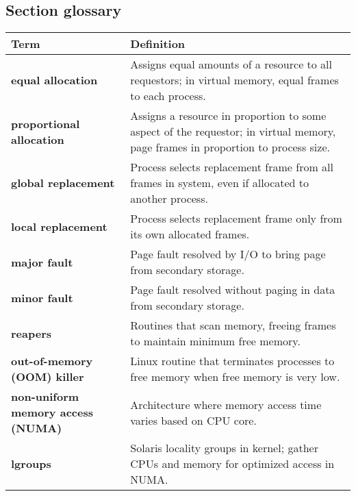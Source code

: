 \vspace{1em}
\subsection*{Section glossary}
\begin{tabular}{p{}p{}}
    \toprule
    \rowcolor{gray!20} \textbf{Term} & \textbf{Definition} \\
    \midrule
    \textbf{equal allocation} & Assigns equal amounts of a resource to all requestors; in virtual memory, equal frames to each process. \\
    \textbf{proportional allocation} & Assigns a resource in proportion to some aspect of the requestor; in virtual memory, page frames in proportion to process size. \\
    \textbf{global replacement} & Process selects replacement frame from all frames in system, even if allocated to another process. \\
    \textbf{local replacement} & Process selects replacement frame only from its own allocated frames. \\
    \textbf{major fault} & Page fault resolved by I/O to bring page from secondary storage. \\
    \textbf{minor fault} & Page fault resolved without paging in data from secondary storage. \\
    \textbf{reapers} & Routines that scan memory, freeing frames to maintain minimum free memory. \\
    \textbf{out-of-memory (OOM) killer} & Linux routine that terminates processes to free memory when free memory is very low. \\
    \textbf{non-uniform memory access (NUMA)} & Architecture where memory access time varies based on CPU core. \\
    \textbf{lgroups} & Solaris locality groups in kernel; gather CPUs and memory for optimized access in NUMA. \\
    \bottomrule
\end{tabular}
